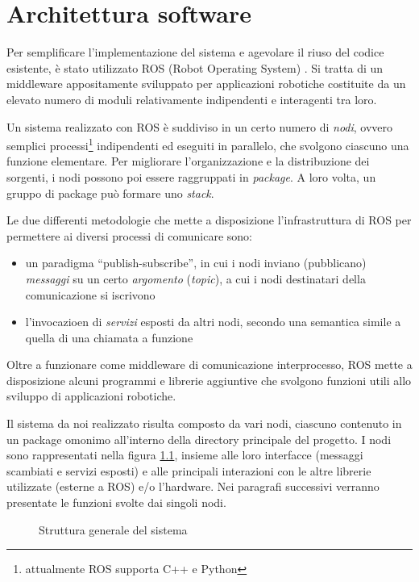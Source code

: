 \chapter{Architettura software}
\label{cap:architetturasw}

Per semplificare l'implementazione del sistema e agevolare il riuso del codice esistente, è stato utilizzato ROS (Robot Operating System) \cite{rosweb}. Si tratta di un middleware appositamente sviluppato per applicazioni robotiche costituite da un elevato numero di moduli relativamente indipendenti e interagenti tra loro.

Un sistema realizzato con ROS è suddiviso in un certo numero di \emph{nodi}, ovvero semplici processi\footnote{attualmente ROS supporta C++ e Python} indipendenti ed eseguiti in parallelo, che svolgono ciascuno una funzione elementare. Per migliorare l'organizzazione e la distribuzione dei sorgenti, i nodi possono poi essere raggruppati in \emph{package}. A loro volta, un gruppo di package può formare uno \emph{stack}.

Le due differenti metodologie che mette a disposizione l'infrastruttura di ROS per permettere ai diversi processi di comunicare sono:
\begin{itemize}
 \item un paradigma ``publish-subscribe'', in cui i nodi inviano (pubblicano) \emph{messaggi} su un certo \emph{argomento} (\emph{topic}), a cui i nodi destinatari della comunicazione si iscrivono
 \item l'invocazioen di \emph{servizi} esposti da altri nodi, secondo una semantica simile a quella di una chiamata a funzione
\end{itemize}

Oltre a funzionare come middleware di comunicazione interprocesso, ROS mette a disposizione alcuni programmi e librerie aggiuntive che svolgono funzioni utili allo sviluppo di applicazioni robotiche.

Il sistema da noi realizzato risulta composto da vari nodi, ciascuno contenuto in un package omonimo all'interno della directory principale del progetto. I nodi sono rappresentati nella figura \ref{fig:schemanodi}, insieme alle loro interfacce (messaggi scambiati e servizi esposti) e alle principali interazioni con le altre librerie utilizzate (esterne a ROS) e/o l'hardware. Nei paragrafi successivi verranno presentate le funzioni svolte dai singoli nodi.

\begin{figure}[h]

\caption{Struttura generale del sistema} 
\label{fig:schemanodi}
\end{figure}

